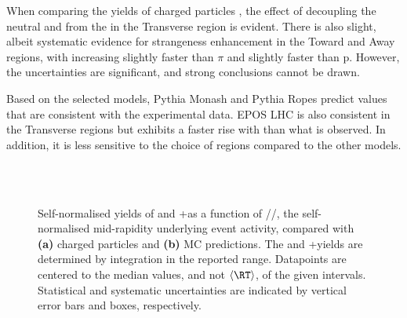When comparing the yields of charged particles \cite{vazquezruedaStudyProductionPp2022}, the effect of decoupling the neutral \KOs and \LA from the \NT in the Transverse region is evident. There is also slight, albeit systematic evidence for strangeness enhancement in the Toward and Away regions, with \KOs increasing slightly faster than $\pi$ and \LA slightly faster than $\mathrm{p}$. However, the uncertainties are significant, and strong conclusions cannot be drawn.

Based on the selected models, Pythia Monash and Pythia Ropes predict values that are consistent with the experimental data. EPOS LHC is also consistent in the Transverse regions but exhibits a faster rise with \RT than what is observed. In addition, it is less sensitive to the choice of regions compared to the other models.

\begin{figure}[H]%
\\
\\
\caption{Self-normalised yields of \KOs and \LA+\AL as a function of \RT/\RTmin/\RTmax, the self-normalised mid-rapidity underlying event activity, compared with \textbf{(a)} charged particles \cite{vazquezruedaStudyProductionPp2022} and \textbf{(b)} MC predictions. The \KOs and \LA+\AL yields are determined by integration in the reported \pt range. Datapoints are centered to the median \RT values, and not $\langle \RT \rangle$, of the given intervals. Statistical and systematic uncertainties are indicated by vertical error bars and boxes, respectively. }
\label{fig:rt:yield}
\end{figure}




